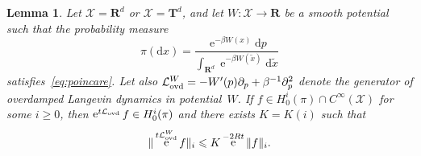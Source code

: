 \documentclass[11pt,a4paper]{article}
\DeclareMathOperator{\e}{e}
\newcommand{\real}{\mathbf R}
\newcommand{\torus}{\mathbf T}
\renewcommand{\d}{\mathrm d}
\theoremstyle{plain}
\newtheorem{lemma}{Lemma}[section]
\numberwithin{equation}{section}
\renewcommand{\leq}{\leqslant}
\renewcommand{\geq}{\geqslant}
\begin{document}
\begin{lemma}
    \label{lemma:overdamped_langevin_decay_derivatives}
    Let $\mathcal X = \real^d$ or $\mathcal X = \torus^d$,
    and let $W: \mathcal X \to \real$ be a smooth potential such that the probability measure
    \[
        \pi(\d x) = \frac{\e^{- \beta W(x)} \d p}{\int_{\real^d} \e^{-\beta W(\widetilde x)} \d \widetilde x}
    \]
    satisfies~\eqref{eq:poincare}. 
    Let also $\mathcal L_{\rm ovd}^W = - W'(p) \partial_p + \beta^{-1} \partial_p^2$ denote the generator of overdamped Langevin dynamics in potential~$W$.
    If $f \in H^i_0(\pi) \cap C^{\infty}(\mathcal X)$ for some $i \geq 0$,
    then $\e^{t \mathcal L_{\rm ovd}} f \in H^i_0(\pi)$ and there exists $K = K(i)$ such that
    \[
        \norm*{\e^{t \mathcal L_{\rm ovd}^W} f}_i \leq K \e^{- 2 R t} \norm*{f}_i.
    \]
\end{lemma}
\end{document}
